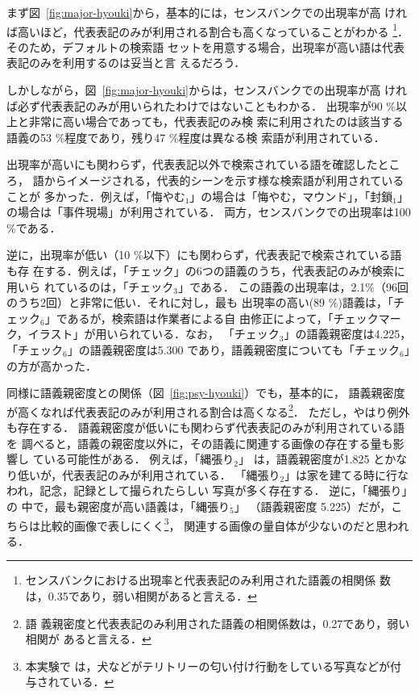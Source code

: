 \documentclass[japanese]{jnlp_1.4}
\newcommand{\gogi}[1]{}
\begin{document}
まず図~\ref{fig:major-hyouki}から，基本的には，センスバンクでの出現率が高
ければ高いほど，代表表記のみが利用される割合も高くなっていることがわかる
\footnote{センスバンクにおける出現率と代表表記のみ利用された語義の相関係
数は，0.35であり，弱い相関があると言える．}．そのため，デフォルトの検索語
セットを用意する場合，出現率が高い語は代表表記のみを利用するのは妥当と言
えるだろう．

しかしながら，図~\ref{fig:major-hyouki}からは，センスバンクでの出現率が高
ければ必ず代表表記のみが用いられたわけではないこともわかる．
出現率が90 \%以上と非常に高い場合であっても，代表表記のみ検
索に利用されたのは該当する語義の53 \%程度であり，残り47 \%程度は異なる検
索語が利用されている．

出現率が高いにも関わらず，代表表記以外で検索されている語を確認したところ，
語からイメージされる，代表的シーンを示す様な検索語が利用されていることが
多かった．例えば，「悔やむ$_1$」の場合は「悔やむ，マウンド」，「封鎖$_1$」
の場合は「事件現場」が利用されている．
両方，センスバンクでの出現率は100 \%である．


逆に，出現率が低い（10 \%以下）にも関わらず，代表表記で検索されている語も存
在する．例えば，「チェック」の6つの語義のうち，代表表記のみが検索に用いら
れているのは，「チェック$_3$」\gogi{洋服地の碁盤の目のような柄．}である．
この語義の出現率は，2.1\%（96回のうち2回）と非常に低い．それに対し，最も
出現率の高い(89 \%)語義は，「チェック$_6$」\gogi{照合の印を付けること．ま
た，その印．また，照合して検査すること．}であるが，検索語は作業者による自
由修正によって，「チェックマーク，イラスト」が用いられている．なお，
「チェック$_3$」の語義親密度は4.225，「チェック$_6$」の語義親密度は5.300
であり，語義親密度についても「チェッ\mbox{ク$_6$」}の方が高かった．


同様に語義親密度との関係（図~\ref{fig:psy-hyouki}）でも，基本的に，
語義親密度が高くなれば代表表記のみが利用される割合は高くなる\footnote{語
義親密度と代表表記のみ利用された語義の相関係数は，0.27であり，弱い相関が
あると言える．}．
ただし，やはり例外も存在する．
語義親密度が低いにも関わらず代表表記のみが利用されている語を
調べると，語義の親密度以外に，その語義に関連する画像の存在する量も影響し
ている可能性がある．
例えば，「縄張り$_2$」 \gogi{建築の敷地に縄を張って建物の位置を定めるこ
と．}は，語義親密度が1.825 とかなり低いが，代表表記のみが利用されている．
「縄張り$_2$」は家を建てる時に行なわれ，記念，記録として撮られたらしい
写真が多く存在する．
逆に，「縄張り」の
中で，最も親密度が高い語義は，「縄張り$_5$」\gogi{動物の個体や集団が，他
の侵入を許すまいと努める地域．テリトリー．}
（語義親密度 5.225）だが，こちらは比較的画像で表しにくく\footnote{本実験で
は，犬などがテリトリーの匂い付け行動をしている写真などが付与されている．}，
関連する画像の量自体が少ないのだと思われる．
\end{document}
